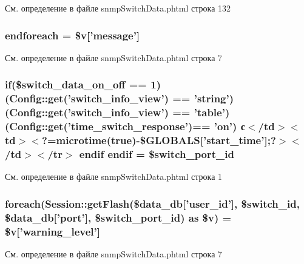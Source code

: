 См. определение в файле snmp\-Switch\-Data.\-phtml строка 132

\hypertarget{snmp_switch_data_8phtml_a672d9707ef91db026c210f98cc601123}{
\subsubsection[{endforeach}]{\setlength{\rightskip}{0pt plus 5cm}endforeach = \$v\mbox{[}'message'\mbox{]}}}\label{snmp_switch_data_8phtml_a672d9707ef91db026c210f98cc601123}


См. определение в файле snmp\-Switch\-Data.\-phtml строка 7

\hypertarget{snmp_switch_data_8phtml_ad46029792e22c84c23775487f5df39df}{
\subsubsection[{endif}]{\setlength{\rightskip}{0pt plus 5cm}if(\$switch\-\_\-data\-\_\-on\-\_\-off == 1)({\bf Config\-::get}('switch\-\_\-info\-\_\-view') == 'string') ({\bf Config\-::get}('switch\-\_\-info\-\_\-view') == 'table') ({\bf Config\-::get}('time\-\_\-switch\-\_\-response')== 'on') с$<$/td$>$$<$td$>$$<$?=microtime(true)-\/\$G\-L\-O\-B\-A\-L\-S\mbox{[}'start\-\_\-time'\mbox{]};?$>$$<$/td$>$$<$/tr$>$ endif endif = \$switch\-\_\-port\-\_\-id}}\label{snmp_switch_data_8phtml_ad46029792e22c84c23775487f5df39df}


См. определение в файле snmp\-Switch\-Data.\-phtml строка 1

\hypertarget{snmp_switch_data_8phtml_a1aebcd3bfc8b09c505928fe2958e6143}{
\subsubsection[{foreach}]{\setlength{\rightskip}{0pt plus 5cm}foreach({\bf Session\-::get\-Flash}(\$data\-\_\-db\mbox{[}'user\-\_\-id'\mbox{]}, \$switch\-\_\-id, \$data\-\_\-db\mbox{[}'port'\mbox{]}, \$switch\-\_\-port\-\_\-id) as \$v) = \$v\mbox{[}'warning\-\_\-level'\mbox{]}}}\label{snmp_switch_data_8phtml_a1aebcd3bfc8b09c505928fe2958e6143}


См. определение в файле snmp\-Switch\-Data.\-phtml строка 7

